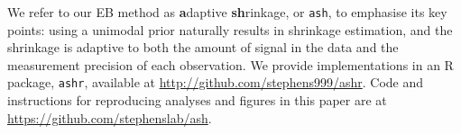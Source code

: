 \documentclass[11pt]{article}
\def\ash{{\tt ash}\xspace}
\def\ashr{{\tt ashr}\xspace}
\begin{document}
We refer to our EB method as {\bf a}daptive {\bf sh}rinkage, or \ash, to emphasise its key points:
using a unimodal prior naturally results in shrinkage estimation,
and the shrinkage is adaptive to both the amount of signal in the data and the measurement precision of each observation. We provide implementations in an R package, \ashr, available at 
\url{http://github.com/stephens999/ashr}.
Code and instructions for reproducing analyses and figures in this paper are at
\url{https://github.com/stephenslab/ash}.



%

\end{document}
